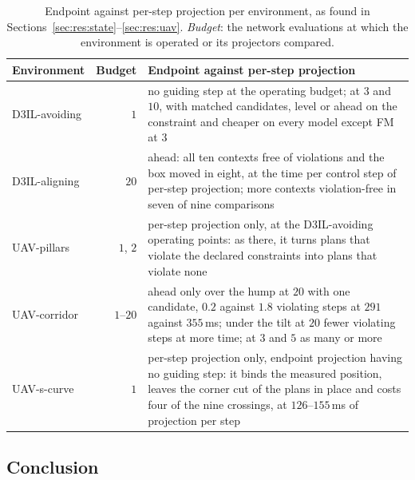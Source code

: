 \begin{table}[htpb]
  \caption[Projection methods across environments]{Endpoint against per-step projection per environment, as
  found in Sections~\ref{sec:res:state}--\ref{sec:res:uav}. \emph{Budget}: the network evaluations at which
  the environment is operated or its projectors compared.}
  \label{tab:summary-projection}
  \centering
  \small
  \begin{tabularx}{\linewidth}{@{}p{2.2cm} r L@{}}
    \toprule
    Environment & Budget & Endpoint against per-step projection \\
    \midrule
    D3IL-avoiding & $1$      & no guiding step at the operating budget; at $3$ and $10$, with matched candidates,
                               level or ahead on the constraint and cheaper on every model except FM at $3$ \\
    D3IL-aligning & $20$     & ahead: all ten contexts free of violations and the box moved in eight, at the time
                               per control step of per-step projection; more contexts violation-free in seven of
                               nine comparisons \\
    UAV-pillars   & $1$, $2$ & per-step projection only, at the D3IL-avoiding operating points: as there, it turns
                               plans that violate the declared constraints into plans that violate none \\
    UAV-corridor  & $1$--$20$ & ahead only over the hump at $20$ with one candidate, $0.2$ against $1.8$ violating
                               steps at $291$ against $355$\,ms; under the tilt at $20$ fewer violating steps at
                               more time; at $3$ and $5$ as many or more \\
    UAV-s-curve   & $1$      & per-step projection only, endpoint projection having no guiding step: it binds the
                               measured position, leaves the corner cut of the plans in place and costs four of the
                               nine crossings, at $126$--$155$\,ms of projection per step \\
    \bottomrule
  \end{tabularx}
\end{table}

\subsection{Conclusion}\label{sec:res:summary:conclusion}

